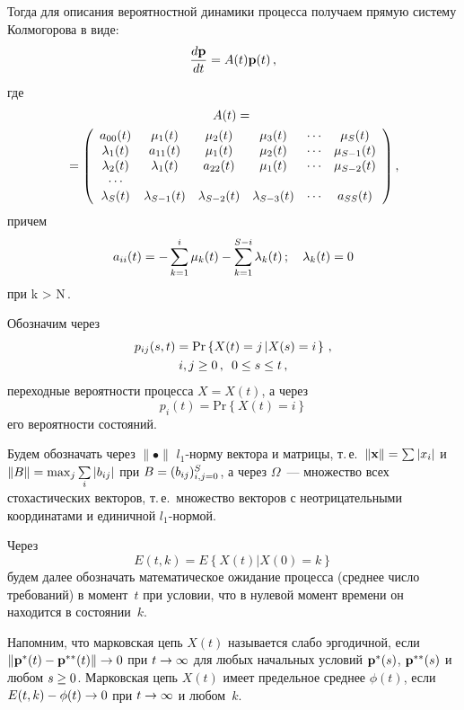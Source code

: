\begin{multicols}{2}
Тогда для описания вероятностной динамики процесса получаем прямую систему
Колмогорова в виде:
\begin{equation*}
\displaystyle\frac{\displaystyle d\mathbf{p}\mathstrut}{\displaystyle dt\mathstrut}=A(t)\mathbf{p}(t)\,,
\end{equation*}
где
\begin{multline*}
A(t)={}\\
\!{}=\left(
\begin{array}{ccccccc}
a_{00}(t) & \mu_1(t)  & \mu_2(t)   & \mu_3(t)  & \cdots & \mu_S(t)  \\
\lambda_1(t)   & a_{11}(t)  & \mu_1(t)  & \mu_2(t)    & \cdots & \mu_{S-1}(t)   \\
\lambda_2(t)  & \lambda_1(t)    & a_{22}(t)& \mu_1(t)    &  \cdots & \mu_{S-2}(t)  \\
\cdots \\
\lambda_S(t)  & \lambda_{S-1}(t)  & \lambda_{S-2}(t) & \lambda_{S-3}(t) & \cdots   & a_{SS}(t)  \\
\end{array}
\right),\hspace{-0.44418pt}
\end{multline*}
\noindent
причем
$$
a_{ii}(t)=-\sum\limits_{k=1}^{i}\mu_k(t) -
\sum\limits_{k=1}^{S-i} \lambda_{k}(t)\,;\quad
\lambda_{k}(t)= 0
$$
 при k > N\,.


Обозначим через
\begin{multline*}
p_{ij}(s,t)=\mathrm{Pr}\left\{ X(t)=j\left| X(s)=i\right.
\right\}\,,\\ i,j \ge 0\,,\enskip 0\leq s\leq t\,,
\end{multline*}
переходные вероятности
процесса $X=X(t)$, а через
$$
p_i(t)=\mathrm{Pr}\left\{ X(t) =i \right\}
$$
его вероятности состояний.


Будем обозначать через $\|\bullet\|$   $l_1$-нор\-му вектора и
матрицы, т.\,е.\  $\|{\bf x}\|\hm=\sum|x_i|$ и $\|B\| \hm= \max_j \sum\limits_i
|b_{ij}|$ при $B \hm= (b_{ij})_{i,j=0}^{S}$, а через  $\Omega$~---
множество всех стохастических векторов, т.\,е.\ множество векторов с
неотрицательными координатами и единичной $l_1$-нор\-мой.

Через
$$
E(t,k) = E\left\{X(t)\left|X(0)=k\right.\right\}
$$
будем далее обозначать математическое ожидание процесса (среднее число
требований) в момент~$t$ при условии, что в нулевой момент времени
он находится в состоянии~$k$.

Напомним, что марковская цепь $X(t)$ называется слабо эргодичной,
если $\| {\bf p^*}(t) \hm- {\bf p^{**}}(t) \| \hm\to 0 $ при $t \hm\to
\infty$ для любых начальных условий  ${\bf p^*}(s)$, ${\bf p^{**}}(s)$
и любом $ s \hm\ge 0$. Марковская цепь $X(t)$ имеет предельное среднее
$\phi (t)$, если $E(t,k)\hm - \phi (t)\hm \to 0$ при $t \hm\to \infty$ и
любом~$k$.


\end{multicols}
